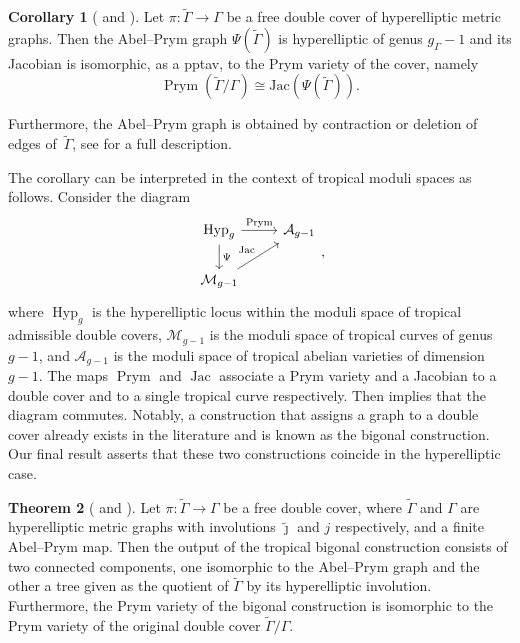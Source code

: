 \documentclass[11pt]{article}
\theoremstyle{definition}
\numberwithin{equation}{section}
\newtheorem{maintheorem}{Theorem}
\newtheorem{maincorollary}[maintheorem]{Corollary}
\theoremstyle{definition}
\newcommand{\tGa}{\widetilde{\Gamma}}
\newcommand{\Ga}{\Gamma}
\newcommand{\tj}{\widetilde{\jmath}}
\newcommand{\calA}{\mathcal{A}}
\newcommand{\calM}{\mathcal{M}}
\newcommand{\wt}[1]{\widetilde{#1}}
\DeclareMathOperator{\Prym}{Prym}
\DeclareMathOperator{\Jac}{Jac}
\begin{document}
\begin{maincorollary}[ and ]\label{mainCorollary:JacobianOfImage}
Let  $\pi\colon \tGa\to \Ga$ be a free  double cover of hyperelliptic metric graphs. Then the  Abel--Prym graph $\Psi(\wt\Gamma)$ is hyperelliptic  of genus $g_{\Ga}-1$ and its Jacobian
is isomorphic, as a pptav, to
the Prym variety of the cover, namely
    \[
    \Prym(\tGa/\Ga)\cong \mathrm{Jac}(\Psi(\tGa)).
    \]
    \end{maincorollary}

\noindent Furthermore, the Abel--Prym graph  is obtained by contraction or deletion of edges of~$\wt\Gamma$, see  for a full description. 


The corollary can be interpreted in the context of tropical moduli spaces as follows. Consider the  diagram
\[
        \begin{tikzcd}
\operatorname{Hyp}_g \arrow[d, "\Psi"] \arrow[r, "\Prym"] & \calA_{g-1}\\
\calM_{g-1}\arrow[ur, "\Jac"]                        &                  
\end{tikzcd},
\]
where $\operatorname{Hyp}_g$ is the hyperelliptic locus within the moduli space of tropical admissible double covers, $\calM_{g-1}$ is the moduli space of tropical curves of genus $g-1$, and $\calA_{g-1}$ is the moduli space of tropical abelian varieties of dimension $g-1$. 
The maps $\Prym$ and $\Jac$ associate a Prym variety and a Jacobian to a double cover and to a single tropical curve respectively. Then  implies that the diagram commutes.   Notably, a construction that  assigns a graph to a double cover already exists in the literature and is known as the bigonal construction. Our final result asserts that these two constructions coincide in the hyperelliptic case.


\begin{maintheorem}[ and ]\label{mainTheorem:bigonal}
      Let $\pi\colon\tGa\to\Ga$ be a free double cover, where $\tGa$ and $\Ga$ are hyperelliptic metric graphs with involutions  $\tj$ and $j$ respectively,  and a finite Abel--Prym map. Then the output of the tropical bigonal construction consists of two connected components, one isomorphic to the Abel--Prym graph and the other a tree given as the quotient of $\wt\Gamma$ by its hyperelliptic involution. 
          Furthermore, the Prym variety of the bigonal construction is isomorphic to the Prym variety of the original double cover $\wt\Gamma/\Gamma$.
\end{maintheorem}
\end{document}
